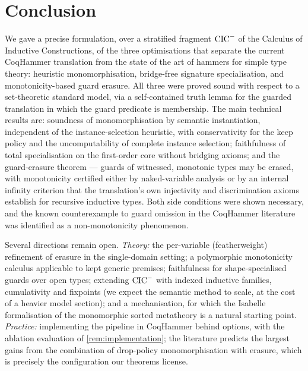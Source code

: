 \section{Conclusion}
\label{sec:conclusion}

We gave a precise formulation, over a stratified fragment $\mathrm{CIC}^{-}$
of the Calculus of Inductive Constructions, of the three
optimisations that separate the current CoqHammer translation from
the state of the art of hammers for simple type theory: heuristic
monomorphisation, bridge-free signature specialisation, and
monotonicity-based guard erasure.  All three were proved sound with
respect to a set-theoretic standard model, via a self-contained
truth lemma for the guarded translation in which the guard
predicate is membership.  The main technical results are: soundness
of monomorphisation by semantic instantiation, independent of the
instance-selection heuristic, with conservativity for the keep
policy and the uncomputability of complete instance selection;
faithfulness of total specialisation on the first-order core
without bridging axioms; and the guard-erasure theorem --- guards
of witnessed, monotonic types may be erased, with monotonicity
certified either by naked-variable analysis or by an internal
infinity criterion that the translation's own injectivity and
discrimination axioms establish for recursive inductive types.
Both side conditions were shown necessary, and the known
counterexample to guard omission in the CoqHammer literature was
identified as a non-monotonicity phenomenon.

Several directions remain open.  \emph{Theory:} the per-variable
(featherweight) refinement of erasure in the single-domain setting;
a polymorphic monotonicity calculus applicable to kept generic
premises; faithfulness for shape-specialised guards over open
types; extending $\mathrm{CIC}^{-}$ with indexed inductive families,
cumulativity and fixpoints (we expect the semantic method to scale,
at the cost of a heavier model section); and a mechanisation, for
which the Isabelle formalisation of the monomorphic sorted
metatheory \cite{BlanchettePopescu2013} is a natural starting
point.  \emph{Practice:} implementing the pipeline in CoqHammer
behind options, with the ablation evaluation of
\cref{rem:implementation}; the literature
\cite{Blanchette2016,Desharnais2022} predicts the largest gains
from the combination of drop-policy monomorphisation with erasure,
which is precisely the configuration our theorems license.
